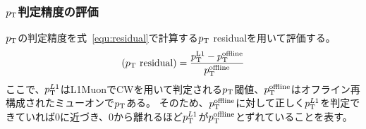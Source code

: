\subsubsection{$p_{\rm{T}}$判定精度の評価}\label{分解能の評価}
$p_{\rm{T}}$の判定精度を式~\eqref{equ:residual}で計算する$p_{\rm{T}}$ residualを用いて評価する。
\begin{equation}
    (p_{\rm{T}}~{\rm{residual}}) = \frac{p_{\rm{T}}^{\rm{L1}}-p_{\rm{T}}^{\rm{offline}}}{p_{\rm{T}}^{\rm{offline}}}
    \label{equ:residual}
\end{equation}
ここで、$p_{\rm{T}}^{L1}$はL1MuonでCWを用いて判定される$p_{\rm{T}}$閾値、$p_{\rm{T}}^{\rm{offline}}$はオフライン再構成されたミューオンで$p_{\rm{T}}$ある。
そのため、$p_{\rm{T}}^{\rm{offline}}$に対して正しく$p_{\rm{T}}^{L1}$を判定できていれば0に近づき、0から離れるほど$p_{\rm{T}}^{L1}$が$p_{\rm{T}}^{\rm{offline}}$とずれていることを表す。

